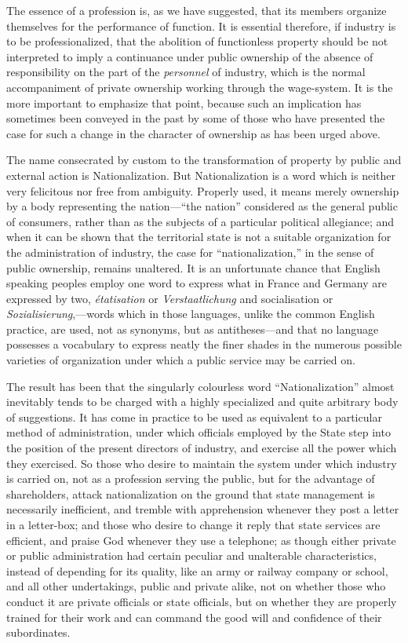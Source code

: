 \documentclass{book}
\begin{document}
The essence of a profession is, as we have suggested, that its members organize themselves for the performance of function. It is essential therefore, if industry is to be professionalized, that the abolition of functionless property should be not interpreted to imply a continuance under public ownership of the absence of responsibility on the part of the \emph{personnel} of industry, which is the normal accompaniment of private ownership working through the wage-system. It is the more important to emphasize that point, because such an implication has sometimes been conveyed in the past by some of those who have presented the case for such a change in the character of ownership as has been urged above.

The name consecrated by custom to the transformation of property by public and external action is Nationalization. But Nationalization is a word which is neither very felicitous nor free from ambiguity. Properly used, it means merely ownership by a body representing the nation—“the nation” considered as the general public of consumers, rather than as the subjects of a particular political allegiance; and when it can be shown that the territorial state is not a suitable organization for the administration of industry, the case for “nationalization,” in the sense of public ownership, remains unaltered. It is an unfortunate chance that English speaking peoples employ one word to express what in France and Germany are expressed by two, \emph{étatisation} or \emph{Verstaatlichung} and socialisation or \emph{Sozialisierung},—words which in those languages, unlike the common English practice, are used, not as synonyms, but as antitheses—and that no language possesses a vocabulary to express neatly the finer shades in the numerous possible varieties of organization under which a public service may be carried on.

The result has been that the singularly colourless word “Nationalization” almost inevitably tends to be charged with a highly specialized and quite arbitrary body of suggestions. It has come in practice to be used as equivalent to a particular method of administration, under which officials employed by the State step into the position of the present directors of industry, and exercise all the power which they exercised. So those who desire to maintain the system under which industry is carried on, not as a profession serving the public, but for the advantage of shareholders, attack nationalization on the ground that state management is necessarily inefficient, and tremble with apprehension whenever they post a letter in a letter-box; and those who desire to change it reply that state services are efficient, and praise God whenever they use a telephone; as though either private or public administration had certain peculiar and unalterable characteristics, instead of depending for its quality, like an army or railway company or school, and all other undertakings, public and private alike, not on whether those who conduct it are private officials or state officials, but on whether they are properly trained for their work and can command the good will and confidence of their subordinates.
\end{document}
